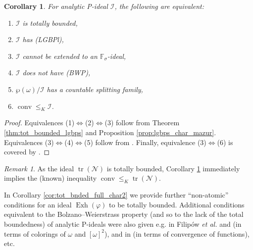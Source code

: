 \documentclass[a4paper,11pt,fleqn]{amsart}
\newtheorem{corollary}[theorem]{Corollary}
\theoremstyle{definition}
\theoremstyle{remark}
\newtheorem{remark}[theorem]{Remark}
\numberwithin{equation}{section}
\newcommand{\N}{\mathbb{N}}
\newcommand{\F}{\mathbb{F}}
\newcommand{\iI}{\mathcal{I}}
\newcommand{\nN}{\mathcal{N}}
\DeclareMathOperator{\conv}{{conv}}
\DeclareMathOperator{\exh}{Exh}
\newcommand{\wo}{{\wp(\omega)}}%
\DeclareMathOperator{\tr}{tr}
\begin{document}
\begin{corollary}\label{cor:tot_bnded_full_char}
For analytic P-ideal $\iI$, the following are equivalent:
\begin{enumerate}
    \item $\iI$ is totally bounded,
    \item $\iI$ has (LGBPl),
    \item $\iI$ cannot be extended to an $\F_\sigma$-ideal,
    \item $\iI$ does not have (BWP),
    \item $\wo/\iI$ has a countable splitting family,
    \item $\conv\le_K\iI$.
\end{enumerate}
\end{corollary}
\begin{proof}
Equivalences (1)$\Leftrightarrow$(2)$\Leftrightarrow$(3) follow from Theorem \ref{thm:tot_bounded_lgbps} and Proposition \ref{prop:lgbps_char_mazur}. Equivalences (3)$\Leftrightarrow$(4)$\Leftrightarrow$(5) follow from \cite[Theorems 4.2 and 5.1]{FMRS07}. Finally, equivalence (3)$\Leftrightarrow$(6) is covered by \cite[Proposition 6.5]{BFMS13}.
\end{proof}

\begin{remark}
    As the ideal $\tr(\nN)$ is totally bounded, Corollary \ref{cor:tot_bnded_full_char} immediately implies the (known) inequality $\conv\le_K\tr(\nN)$. 
\end{remark}

In Corollary \ref{cor:tot_bnded_full_char2} we provide further ``non-atomic'' conditions for an ideal $\exh(\varphi)$ to be totally bounded. Additional conditions equivalent to the Bolzano--Weierstrass property (and so to the lack of the total boundedness) of analytic P-ideals were also given e.g. in Filip\'{o}w \textit{et al.} \cite{FMRS11} and \cite[Section 4]{FS10c} (in terms of colorings of $\omega$ and $[\omega]^2$), and in \cite{FMRS12} (in terms of convergence of functions), etc.


\end{document}
